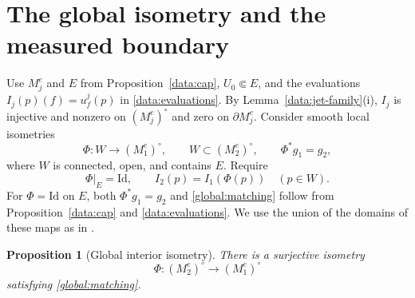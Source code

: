 \documentclass[11pt,a4paper]{article}
\newtheorem{proposition}[theorem]{Proposition}
\theoremstyle{definition}
\theoremstyle{remark}
\newcommand{\Id}{\mathrm{Id}}
\numberwithin{equation}{section}
\begin{document}
\section{The global isometry and the measured boundary}
\label{global:section}

Use $M_j^e$ and $E$ from Proposition~\ref{data:cap},
$U_0\Subset E$, and the evaluations $I_j(p)(f)=u_f^j(p)$ in
\eqref{data:evaluations}. By Lemma~\ref{data:jet-family}(i), $I_j$
is injective and nonzero on $(M_j^e)^\circ$ and zero on
$\partial M_j^e$. Consider smooth local isometries
\[
 \Phi:W\longrightarrow(M_1^e)^\circ,\qquad
 W\subset(M_2^e)^\circ,\qquad \Phi^*g_1=g_2,
\]
where $W$ is connected, open, and contains $E$. Require
\begin{equation}\label{global:matching}
 \Phi|_E=\Id,\qquad I_2(p)=I_1(\Phi(p))\quad(p\in W).
\end{equation}
For $\Phi=\Id$ on $E$, both $\Phi^*g_1=g_2$ and
\eqref{global:matching} follow from Proposition~\ref{data:cap}
and \eqref{data:evaluations}. We use the union of the domains of
these maps as in \citep[Section~6.1]{LLS20}.

\begin{proposition}[Global interior isometry]\label{global:frontier}
There is a surjective isometry
\[
 \Phi:(M_2^e)^\circ\longrightarrow(M_1^e)^\circ
\]
satisfying \eqref{global:matching}.
\end{proposition}
\end{document}
